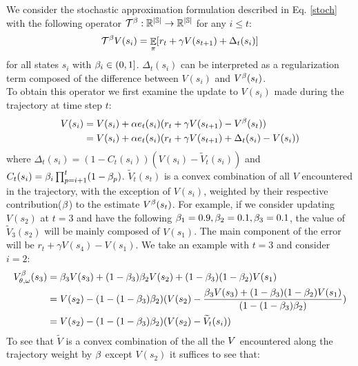 We consider the stochastic approximation formulation described in Eq. \ref{stoch} with the following operator $\mathcal{T}^{\beta}: \mathbb{R^{|\mathbb{S}|}} \rightarrow \mathbb{R^{|\mathbb{S}|}}$ for any $i \leq t$:
\begin{equation}
    \mathcal{T}^{\beta} V(s_i) = \mathop{\mathbb{E}}_{\pi}[r_t + \gamma V(s_{t+1}) + \Delta_t(s_i)]
\end{equation}
for all states $s_i$ with $\beta_i \in (0,1]$. $\Delta_t(s_i)$ can be interpreted as a regularization term composed of the difference between $V(s_i)$ and $V^{\beta}(s_t)$. \\
To obtain this operator we first examine the update to $V(s_i)$ made during the trajectory at time step $t$:
\begin{equation}
\label{decompose}
\begin{split}
    V(s_i) &= V(s_i) + \alpha e_t(s_i) ( r_t + \gamma V(s_{t+1}) - V^{\beta}(s_t)) \\
    &= V(s_i) + \alpha e_t(s_i) ( r_t + \gamma V(s_{t+1}) + \Delta_t(s_i) - V(s_i))
\end{split}
\end{equation}
where $\Delta_t(s_i) = (1-C_t(s_i))(V(s_i) - \widetilde{V}_t(s_i) )$ and  $C_t(s_i) = \beta_i \prod_{p=i+1}^t (1-\beta_p)$.
$\widetilde{V}_t(s_t)$ is a convex combination of all $V$ encountered in the trajectory, with the exception of $V(s_i)$, weighted by their respective contribution($\beta$) to the estimate $V^{\beta}(s_t)$. For example, if we consider updating $V(s_2)$ at $t=3$ and have the following $\beta_1 = 0.9,\beta_2 = 0.1,\beta_3 = 0.1$, the value of $\widetilde{V}_3(s_2)$ will be mainly composed of $V(s_1)$. The main component of the error will be $r_t + \gamma V(s_4) - V(s_1)$. 
We take an example with $t=3$ and consider $i=2$:
\begin{equation}
    \begin{split}
        V^{\beta}_{\theta, \omega}(s_3) &= \beta_3 V(s_3) + (1-\beta_3)\beta_2 V(s_2) + (1-\beta_3)(1-\beta_2)  V(s_1)\\
        &= V(s_2) - (1-(1-\beta_3)\beta_2)(V(s_2) - \frac{\beta_3 V(s_3) + (1-\beta_3)(1-\beta_2)  V(s_1)}{(1-(1-\beta_3)\beta_2)})\\
        &= V(s_2) - (1-(1-\beta_3)\beta_2)(V(s_2) - \widetilde{V}_t(s_i))
    \end{split}
\end{equation}
To see that $\widetilde{V}$ is a convex combination of the all the $V$ encountered along the trajectory weight by $\beta$ except $V(s_2)$ it suffices to see that:
